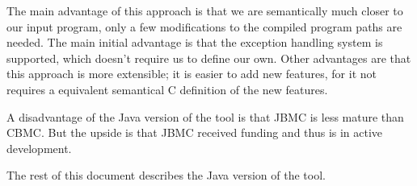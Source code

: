 The main advantage of this approach is that we are semantically much closer to
our input program, only a few modifications to the compiled program paths are
needed. The main initial advantage is that the exception handling system is 
supported, which doesn't require us to define our own. Other advantages are that 
this approach is more extensible; it is easier to add new features, for it not 
requires a equivalent semantical C definition of the new features.

A disadvantage of the Java version of the tool is that JBMC is less mature than
CBMC. But the upside is that JBMC received funding and thus is in active 
development.

The rest of this document describes the Java version of the tool.